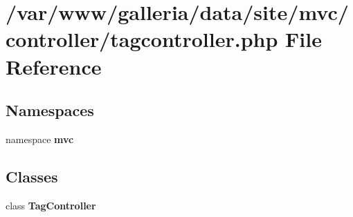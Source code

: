 \section{/var/www/galleria/data/site/mvc/controller/tagcontroller.php File Reference}
\label{tagcontroller_8php}
\subsection*{Namespaces}
\begin{CompactItemize}
\item 
namespace {\bf mvc}
\end{CompactItemize}
\subsection*{Classes}
\begin{CompactItemize}
\item 
class {\bf TagController}
\end{CompactItemize}
